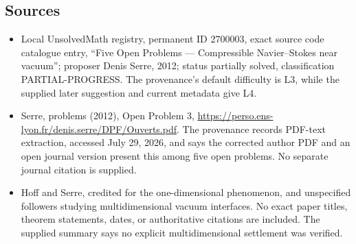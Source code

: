 \documentclass[11pt]{article}
\begin{document}
\subsection{Sources}
\begin{itemize}
\item Local UnsolvedMath registry, permanent ID 2700003, exact source code catalogue entry, ``Five Open Problems --- Compressible Navier--Stokes near vacuum''; proposer Denis Serre, 2012; status partially solved, classification PARTIAL-PROGRESS. The provenance's default difficulty is L3, while the supplied later suggestion and current metadata give L4.
\item Serre, problems (2012), Open Problem 3, \url{https://perso.ens-lyon.fr/denis.serre/DPF/Ouverts.pdf}. The provenance records PDF-text extraction, accessed July 29, 2026, and says the corrected author PDF and an open journal version present this among five open problems. No separate journal citation is supplied.
\item Hoff and Serre, credited for the one-dimensional phenomenon, and unspecified followers studying multidimensional vacuum interfaces. No exact paper titles, theorem statements, dates, or authoritative citations are included. The supplied summary says no explicit multidimensional settlement was verified.
\end{itemize}
\end{document}
